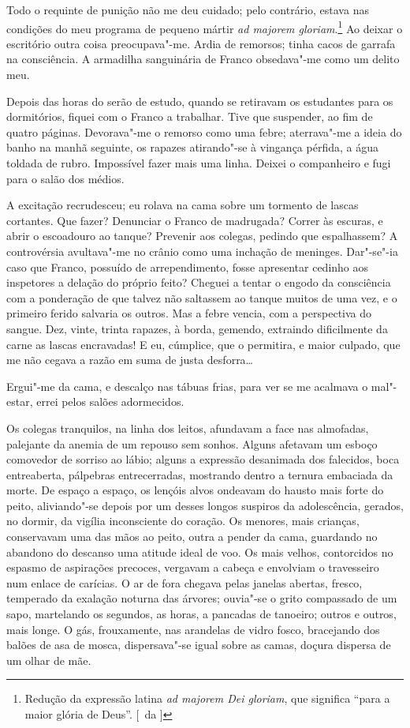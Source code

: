 Todo o requinte de punição não me deu cuidado; pelo
contrário, estava nas condições do meu programa de pequeno mártir \textit{ad
majorem gloriam}.\footnote{ Redução da expressão latina \textit{ad majorem Dei gloriam}, 
que significa ``para a maior glória de Deus''. [~da ]} 
Ao deixar o escritório outra coisa preocupava"-me.
Ardia de remorsos; tinha cacos de garrafa na consciência. A armadilha
sanguinária de Franco obsedava"-me como um delito meu. 

Depois das horas do serão de estudo, quando se retiravam os estudantes para os
dormitórios, fiquei com o Franco a trabalhar. Tive que suspender, ao
fim de quatro páginas. Devorava"-me o remorso como uma febre;
aterrava"-me a ideia do banho na manhã seguinte, os rapazes
atirando"-se à vingança pérfida, a água toldada de rubro. Impossível
fazer mais uma linha. Deixei o companheiro e fugi para o salão dos médios. 

A excitação recrudesceu; eu rolava na cama sobre um tormento de
lascas cortantes. Que fazer? Denunciar o Franco de madrugada? Correr às
escuras, e abrir o escoadouro ao tanque? Prevenir aos colegas, pedindo
que espalhassem? A controvérsia avultava"-me no crânio como uma
inchação de meninges. Dar"-se"-ia caso que Franco, possuído de
arrependimento, fosse apresentar cedinho aos inspetores a delação do
próprio feito? Cheguei a tentar o engodo da consciência com a
ponderação de que talvez não saltassem ao tanque muitos de uma vez, e o
primeiro ferido salvaria os outros. Mas a febre vencia, com a
perspectiva do sangue. Dez, vinte, trinta rapazes, à borda, gemendo,
extraindo dificilmente da carne as lascas encravadas! E eu, cúmplice,
que o permitira, e maior culpado, que me não cegava a razão em suma de
justa desforra\ldots{} 

Ergui"-me da cama, e descalço nas tábuas frias, para
ver se me acalmava o mal"-estar, errei pelos salões adormecidos. 

Os colegas tranquilos, na linha dos leitos, afundavam a face nas
almofadas, palejante da anemia de um repouso sem sonhos. Alguns
afetavam um esboço comovedor de sorriso ao lábio; alguns a expressão
desanimada dos falecidos, boca entreaberta, pálpebras entrecerradas,
mostrando dentro a ternura embaciada da morte. De espaço a espaço, os
lençóis alvos ondeavam do hausto mais forte do peito, aliviando"-se
depois por um desses longos suspiros da adolescência, gerados, no
dormir, da vigília inconsciente do coração. Os menores, mais crianças,
conservavam uma das mãos ao peito, outra a pender da cama, guardando no
abandono do descanso uma atitude ideal de voo. Os mais velhos,
contorcidos no espasmo de aspirações precoces, vergavam a cabeça e
envolviam o travesseiro num enlace de carícias. O ar de fora chegava
pelas janelas abertas, fresco, temperado da exalação noturna das
árvores; ouvia"-se o grito compassado de um sapo, martelando os
segundos, as horas, a pancadas de tanoeiro; outros e outros, mais
longe. O gás, frouxamente, nas arandelas de vidro fosco, bracejando dos
balões de asa de mosca, dispersava"-se igual sobre as camas, doçura
dispersa de um olhar de mãe. 

